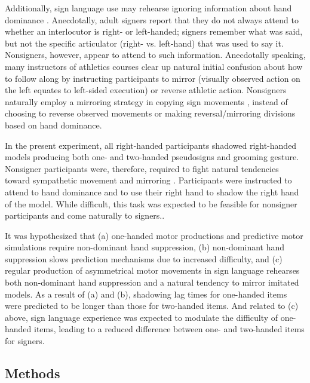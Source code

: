             Additionally, sign language use may rehearse ignoring information about hand dominance \cite{shield2018}. Anecdotally, adult signers report that they do not always attend to whether an interlocutor is right- or left-handed; signers remember what was said, but not the specific articulator (right- vs. left-hand) that was used to say it. Nonsigners, however, appear to attend to such information. Anecdotally speaking, many instructors of athletics courses clear up natural initial confusion about how to follow along by instructing participants to mirror (visually observed action on the left equates to left-sided execution) or reverse athletic action. Nonsigners naturally employ a mirroring strategy in copying sign movements \cite{pier2014, shield2018}, instead of choosing to reverse observed movements or making reversal/mirroring divisions based on hand dominance. \par
            In the present experiment, all right-handed participants shadowed right-handed models producing both one- and two-handed pseudosigns and grooming gesture. Nonsigner participants were, therefore, required to fight natural tendencies toward sympathetic movement \cite{meier2006} and mirroring \cite{pier2014}. Participants were instructed to attend to hand dominance and to use their right hand to shadow the right hand of the model. While difficult, this task was expected to be feasible for nonsigner participants and come naturally to signers.. \par
            \label{par:sym_hyp} It was hypothesized that (a) one-handed motor productions and predictive motor simulations require non-dominant hand suppression, (b) non-dominant hand suppression slows prediction mechanisms due to increased difficulty, and (c) regular production of asymmetrical motor movements in sign language rehearses both non-dominant hand suppression and a natural tendency to mirror imitated models. As a result of (a) and (b), shadowing lag times for one-handed items were predicted to be longer than those for two-handed items. And related to (c) above, sign language experience was expected to modulate the difficulty of one-handed items, leading to a reduced difference between one- and two-handed items for signers. \par
    \subsection{Methods}
        \label{sec:shad_meth}
